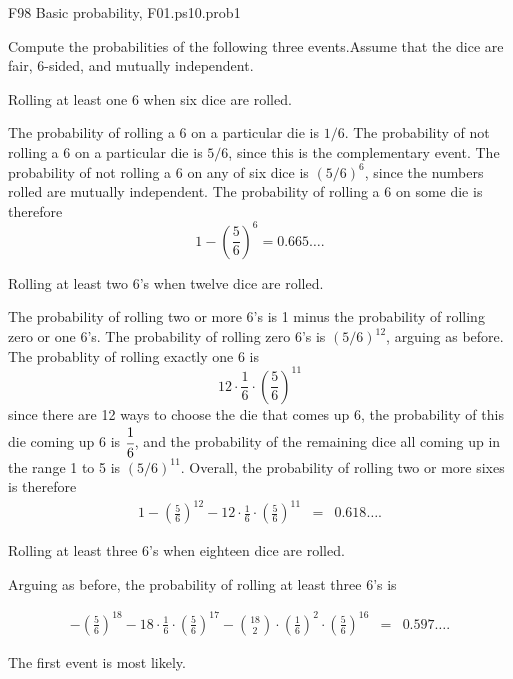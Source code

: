 \begin{problem}
\begin{staffnotes}
F98 Basic probability, F01.ps10.prob1
\end{staffnotes}

Compute the probabilities of the following three events.\iffalse and
determine which one is most likely.\fi Assume that the dice are fair,
6-sided, and mutually independent.

\begin{problemparts}
\problempart Rolling at least one 6 when six dice are rolled.

\begin{solution}
The probability of rolling a 6 on a particular die is $1/6$.  The
probability of not rolling a 6 on a particular die is $5/6$, since
this is the complementary event.  The probability of not rolling a 6
on any of six dice is $(5/6)^6$, since the numbers rolled are mutually
independent.  The probability of rolling a 6 on some die is therefore
\[
1 - (\frac{5}{6})^6 = 0.665\ldots.
\]
\end{solution}

\problempart Rolling at least two 6's when twelve dice are rolled.

\begin{solution}
The probability of rolling two or more 6's is 1 minus the probability
of rolling zero or one 6's.  The probability of rolling zero 6's is
$(5/6)^{12}$, arguing as before.  The probablity of rolling exactly
one 6 is
\[
12 \cdot \frac{1}{6} \cdot \left(\frac{5}{6}\right)^{11}
\]
since there are 12 ways to choose the die that comes up 6, the
probability of this die coming up 6 is $\cfrac{1}{6}$, and the
probability of the remaining dice all coming up in the range 1 to 5 is
$(5/6)^{11}$.  Overall, the probability of rolling two or more sixes
is therefore
\begin{eqnarray*}
1 - \left(\frac{5}{6}\right)^{12} -
        12 \cdot \frac{1}{6} \cdot \left(\frac{5}{6}\right)^{11}
                & = &   0.618\ldots.
\end{eqnarray*}

\end{solution}

\problempart Rolling at least three 6's when eighteen dice are rolled.

\begin{solution}
Arguing as before, the probability of rolling at least three 6's is


\begin{eqnarray*}
       - \left(\frac{5}{6}\right)^{18}
        - 18 \cdot \frac{1}{6} \cdot \left(\frac{5}{6}\right)^{17}
        - \binom{18}{2} \cdot \left(\frac{1}{6}\right)^2 \cdot
                \left(\frac{5}{6}\right)^{16}
        & = &   0.597\ldots.
\end{eqnarray*}
\end{solution}

\end{problemparts}

\begin{solution}
The first event is most likely.
\end{solution}
\end{problem}


